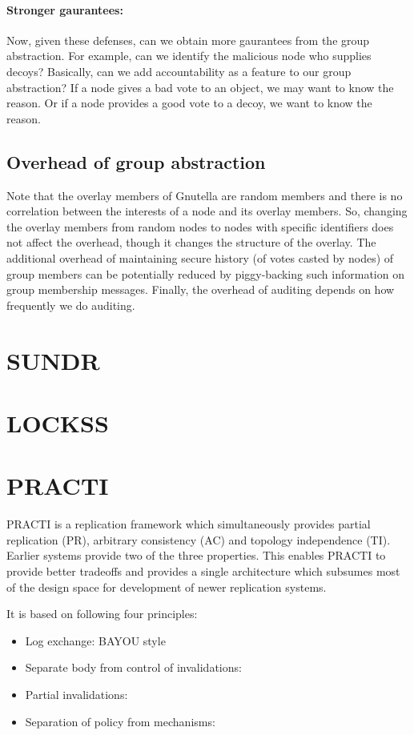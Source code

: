 \paragraph{Stronger gaurantees:} Now, given these defenses, can we obtain more gaurantees from the group abstraction. For example, can we identify the malicious node who supplies decoys? Basically, can we add accountability as a feature to our group abstraction? If a node gives a bad vote to an object, we may want to know the reason. Or if a node provides a good vote to a decoy, we want to know the reason.


\subsection{Overhead of group abstraction}
Note that the overlay members of Gnutella are random members and there is no correlation between the interests of a node and its overlay members. So, changing the overlay members from random nodes to nodes with specific identifiers does not affect the overhead, though it changes the structure of the overlay. The additional overhead of maintaining secure history (of votes casted by nodes) of group members can be potentially reduced by piggy-backing such information on group membership messages. Finally, the overhead of auditing depends on how frequently we do auditing. 

\section{SUNDR}

\section{LOCKSS}

\section{PRACTI}
PRACTI is a replication framework which simultaneously provides partial replication (PR), arbitrary consistency (AC) and topology independence (TI). Earlier systems provide two of the three properties. This enables PRACTI to provide better tradeoffs and provides a single architecture which subsumes most of the design space for development of newer replication systems.

It is based on following four principles:
\begin{itemize}
\item{Log exchange:} BAYOU style
\item{Separate body from control of invalidations:}
\item{Partial invalidations:}
\item{Separation of policy from mechanisms:}
\end{itemize}

